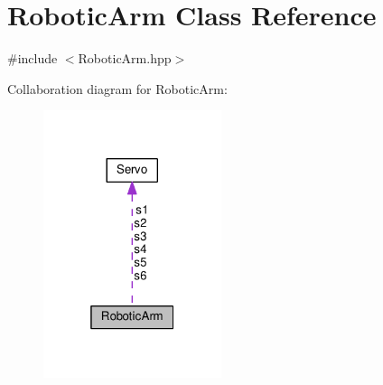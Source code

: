 \hypertarget{class_robotic_arm}{}\section{Robotic\+Arm Class Reference}
\label{class_robotic_arm}


{\ttfamily \#include $<$Robotic\+Arm.\+hpp$>$}



Collaboration diagram for Robotic\+Arm\+:\nopagebreak
\begin{figure}[H]
\begin{center}
\leavevmode
\includegraphics[width=148pt]{class_robotic_arm__coll__graph}
\end{center}
\end{figure}

